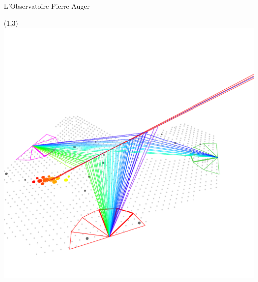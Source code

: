 \documentclass[t, compress]{beamer}
\begin{document}
\begin{frame}[c, fragile]{L'Observatoire Pierre Auger}

  \begin{textblock}{6}(1,3)
    \includegraphics[scale=0.25]{figures/AugerEvent-1}
  \end{textblock}


\end{frame}
\end{document}
